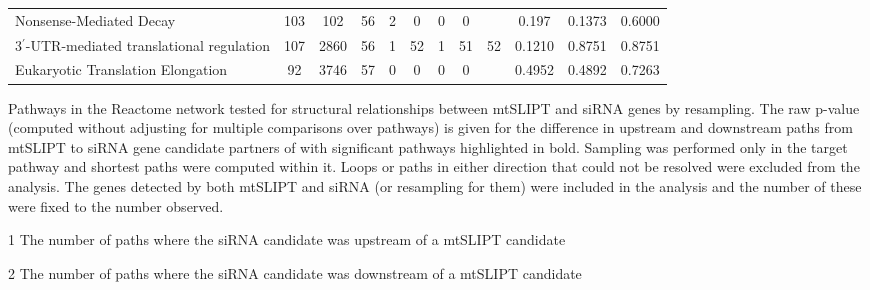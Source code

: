 \begin{table*}[!htb]
{{\begin{threeparttable}
\begin{tabular}{l|cc|cc|cccc|cc|c}
  \rowcolor{black!5}
Nonsense-Mediated Decay                   & 103   & 102    & 56   & 2     & 0    & 0    & 0       &                   & 0.197  & 0.1373 & 0.6000  \\
  \rowcolor{black!10}
3$^\prime$-UTR-mediated translational regulation & 107   & 2860   & 56   & 1     & 52   & 1    & 51      & 52                & 0.1210  & 0.8751 & 0.8751  \\
  \rowcolor{black!5}
Eukaryotic Translation Elongation         & 92    & 3746   & 57   & 0     & 0    & 0    & 0       &                   & 0.4952 & 0.4892 &  0.7263  \\ 
\hline
\end{tabular}
\begin{tablenotes}
\raggedright \small
Pathways in the Reactome network tested for structural relationships between \acrshort{mtSLIPT} and \gls{siRNA} genes by resampling. The raw p-value (computed without adjusting for multiple comparisons over pathways) is given for the difference in upstream and downstream paths from \acrshort{mtSLIPT} to \gls{siRNA} gene candidate partners of  with significant pathways highlighted in bold. Sampling was performed only in the target pathway and shortest paths were computed within it. Loops or paths in either direction that could not be resolved were excluded from the analysis. The genes detected by both \acrshort{mtSLIPT} and \gls{siRNA} (or resampling for them) were included in the analysis and the number of these were fixed to the number observed.

\item[1] The number of paths where the \gls{siRNA} candidate was upstream of a \acrshort{mtSLIPT} candidate

\item[2] The number of paths where the \gls{siRNA} candidate was downstream of a \acrshort{mtSLIPT} candidate
\end{tablenotes}
\end{threeparttable}
}
}
\end{table*}


\FloatBarrier
